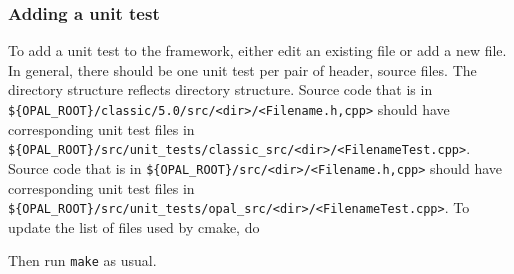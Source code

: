 \subsubsection{Adding a unit test}
To add a unit test to the \opal framework, either edit an existing file or add a new file. In general, there should be one unit test per pair of header, source files. The directory structure reflects \opal directory structure. Source code that is in \verb|${OPAL_ROOT}/classic/5.0/src/<dir>/<Filename.h,cpp>| should have corresponding unit test files in \verb|${OPAL_ROOT}/src/unit_tests/classic_src/<dir>/<FilenameTest.cpp>|. Source code that is in \verb|${OPAL_ROOT}/src/<dir>/<Filename.h,cpp>| should have corresponding unit test files in \verb|${OPAL_ROOT}/src/unit_tests/opal_src/<dir>/<FilenameTest.cpp>|. To update the list of files used by cmake, do
Then run \verb|make| as usual.

